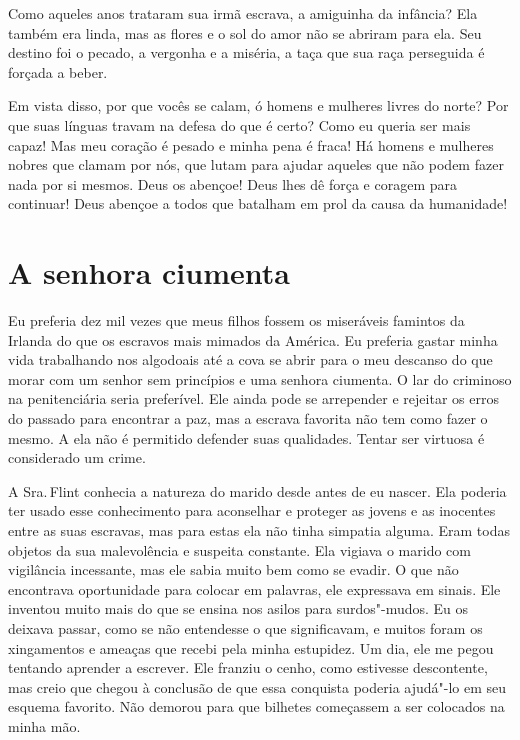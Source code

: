 Como aqueles anos trataram sua irmã
escrava, a amiguinha da infância? Ela também era linda, mas as flores e
o sol do amor não se abriram para ela. Seu destino foi o pecado, a
vergonha e a miséria, a taça que sua raça perseguida é forçada a beber.

Em vista disso, por que vocês se calam,
ó homens e mulheres livres do norte? Por que suas línguas travam na
defesa do que é certo? Como eu queria ser mais capaz! Mas meu coração é
pesado e minha pena é fraca! Há homens e mulheres nobres que clamam por
nós, que lutam para ajudar aqueles que não podem fazer nada por si
mesmos. Deus os abençoe! Deus lhes dê força e coragem para continuar!
Deus abençoe a todos que batalham em prol da causa da humanidade!

\chapter*{A senhora ciumenta}

Eu preferia dez mil vezes que meus
filhos fossem os miseráveis famintos da Irlanda do que os escravos mais
mimados da América. Eu preferia gastar minha vida trabalhando nos
algodoais até a cova se abrir para o meu descanso do que morar com um
senhor sem princípios e uma senhora ciumenta. O lar do criminoso na
penitenciária seria preferível. Ele ainda pode se arrepender e rejeitar
os erros do passado para encontrar a paz, mas a escrava favorita não tem
como fazer o mesmo. A ela não é permitido defender suas qualidades.
Tentar ser virtuosa é considerado um crime.

A Sra.\,Flint conhecia a natureza do
marido desde antes de eu nascer. Ela poderia ter usado esse conhecimento
para aconselhar e proteger as jovens e as inocentes entre as suas
escravas, mas para estas ela não tinha simpatia alguma. Eram todas
objetos da sua malevolência e suspeita constante. Ela vigiava o marido
com vigilância incessante, mas ele sabia muito bem como se evadir. O que
não encontrava oportunidade para colocar em palavras, ele expressava em
sinais. Ele inventou muito mais do que se ensina nos asilos para
surdos"-mudos. Eu os deixava passar, como se não entendesse o que
significavam, e muitos foram os xingamentos e ameaças que recebi pela
minha estupidez. Um dia, ele me pegou tentando aprender a escrever. Ele
franziu o cenho, como estivesse descontente, mas creio que chegou à
conclusão de que essa conquista poderia ajudá"-lo em seu esquema
favorito. Não demorou para que bilhetes começassem a ser colocados na
minha mão.

